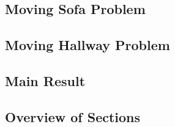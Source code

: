 \subsection{Moving Sofa Problem}
\label{sec:moving-sofa-problem}


\subsection{Moving Hallway Problem}
\label{sec:moving-hallway-problem}


\subsection{Main Result}
\label{sec:main-result}


\subsection{Overview of Sections}
\label{sec:overview-of-sections}


